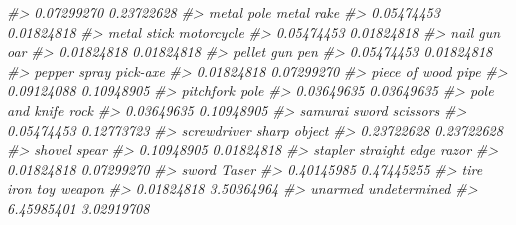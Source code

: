 \documentclass[
  12pt,
]{book}
\newenvironment{Shaded}{\begin{snugshade}}{\end{snugshade}}
\newcommand{\CommentTok}[1]{\textcolor[rgb]{0.37,0.37,0.37}{\textit{#1}}}
\begin{document}
\begin{Shaded}
\begin{Highlighting}[]
\CommentTok{\#>                       0.07299270                       0.23722628 }
\CommentTok{\#>                       metal pole                       metal rake }
\CommentTok{\#>                       0.05474453                       0.01824818 }
\CommentTok{\#>                      metal stick                       motorcycle }
\CommentTok{\#>                       0.05474453                       0.01824818 }
\CommentTok{\#>                         nail gun                              oar }
\CommentTok{\#>                       0.01824818                       0.01824818 }
\CommentTok{\#>                       pellet gun                              pen }
\CommentTok{\#>                       0.05474453                       0.01824818 }
\CommentTok{\#>                     pepper spray                         pick{-}axe }
\CommentTok{\#>                       0.01824818                       0.07299270 }
\CommentTok{\#>                    piece of wood                             pipe }
\CommentTok{\#>                       0.09124088                       0.10948905 }
\CommentTok{\#>                        pitchfork                             pole }
\CommentTok{\#>                       0.03649635                       0.03649635 }
\CommentTok{\#>                   pole and knife                             rock }
\CommentTok{\#>                       0.03649635                       0.10948905 }
\CommentTok{\#>                    samurai sword                         scissors }
\CommentTok{\#>                       0.05474453                       0.12773723 }
\CommentTok{\#>                      screwdriver                     sharp object }
\CommentTok{\#>                       0.23722628                       0.23722628 }
\CommentTok{\#>                           shovel                            spear }
\CommentTok{\#>                       0.10948905                       0.01824818 }
\CommentTok{\#>                          stapler              straight edge razor }
\CommentTok{\#>                       0.01824818                       0.07299270 }
\CommentTok{\#>                            sword                            Taser }
\CommentTok{\#>                       0.40145985                       0.47445255 }
\CommentTok{\#>                        tire iron                       toy weapon }
\CommentTok{\#>                       0.01824818                       3.50364964 }
\CommentTok{\#>                          unarmed                     undetermined }
\CommentTok{\#>                       6.45985401                       3.02919708 }

\end{Highlighting}
\end{Shaded}
\end{document}
